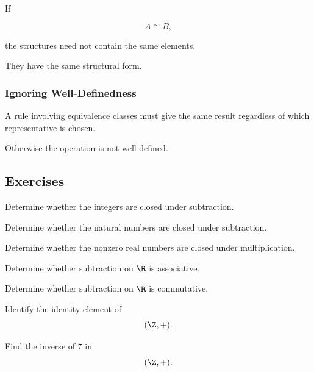 If

\[ A\cong B, \]

the structures need not contain the same elements.

They have the same structural form.

\subsubsection{Ignoring Well-Definedness}
\label{subsec:error-well-definedness}

A rule involving equivalence classes must give the same result regardless of
which representative is chosen.

Otherwise the operation is not well defined.

\subsection{Exercises}
\label{subsec:abstract-algebra-exercises}

\begin{exercise}[1]
Determine whether the integers are closed under subtraction.
\end{exercise}

\begin{exercise}[1]
Determine whether the natural numbers are closed under subtraction.
\end{exercise}

\begin{exercise}[1]
Determine whether the nonzero real numbers are closed under multiplication.
\end{exercise}

\begin{exercise}[1]
Determine whether subtraction on \(\R\) is associative.
\end{exercise}

\begin{exercise}[1]
Determine whether subtraction on \(\R\) is commutative.
\end{exercise}

\begin{exercise}[1]
Identify the identity element of
\[ (\Z,+). \]
\end{exercise}

\begin{exercise}[1]
Find the inverse of \(7\) in
\[ (\Z,+). \]
\end{exercise}


